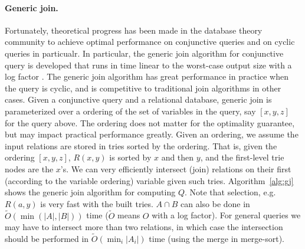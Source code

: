 \paragraph{Generic join.} Fortunately, theoretical progress has been made in the database theory community to achieve optimal performance on conjunctive queries and on cyclic queries in particualr. In particular, the generic join algorithm for conjunctive query is developed that runs in time linear to the worst-case output size with a log factor \citep{wcoj}. 
The generic join algorithm has great performance in practice when the query is cyclic, and is competitive to traditional join algorithms in other cases.
Given a conjunctive query and a relational database, generic join is parameterized over a ordering of the set of variables in the query, say $[x,y,z]$ for the query above. The ordering does not matter for the optimality guarantee, but may impact practical performance greatly. 
Given an ordering,
we assume the input relations are stored in tries sorted by the ordering.
That is, given the ordering $[x,y,z]$,
$R(x,y)$ is sorted by $x$ and then $y$,
and the first-level trie nodes are the $x$'s.
We can very efficiently intersect (join) relations on their
first (according to the variable ordering) variable given such tries.
Algorithm~\ref{alg:gj} shows the generic join algorithm for computing $Q$.
Note that selection, e.g. $R(a, y)$ is very fast with the built tries.
$A \cap B$ can also be done in $\tilde{O}(\min(|A|, |B|))$ time
($\tilde{O}$ means $O$ with a log factor).
For general queries we may have to intersect more than two relations,
in which case the intersection should be performed in
$\tilde{O}(\min_i|A_i|)$ time (using the merge in merge-sort).
